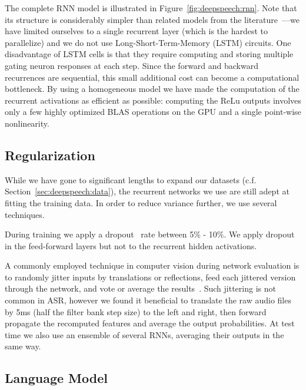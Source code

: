 The complete RNN model is illustrated in Figure~\ref{fig:deepspeech:rnn}. Note
that its structure is considerably simpler than related models from the
literature~\cite{graves2014}---we have limited ourselves to a single recurrent
layer (which is the hardest to parallelize) and we do not use
Long-Short-Term-Memory (LSTM) circuits. One disadvantage of LSTM cells is that
they require computing and storing multiple gating neuron responses at each
step. Since the forward and backward recurrences are sequential, this small
additional cost can become a computational bottleneck. By using a homogeneous
model we have made the computation of the recurrent activations as efficient as
possible: computing the ReLu outputs involves only a few highly optimized BLAS
operations on the GPU and a single point-wise nonlinearity.

\subsection{Regularization}

While we have gone to significant lengths to expand our datasets (c.f.
Section~\ref{sec:deepspeech:data}), the recurrent networks we use are still
adept at fitting the training data. In order to reduce variance further, we use
several techniques.  

During training we apply a dropout~\cite{hinton2012dropout} rate between 5\% -
10\%. We apply dropout in the feed-forward layers but not to the recurrent
hidden activations.

A commonly employed technique in computer vision during network evaluation is
to randomly jitter inputs by translations or reflections, feed each jittered
version through the network, and vote or average the
results~\cite{krizhevsky2012imagenet}. Such jittering is not common in ASR,
however we found it beneficial to translate the raw audio files by 5ms (half
the filter bank step size) to the left and right, then forward propagate the
recomputed features and average the output probabilities. At test time we also
use an ensemble of several RNNs, averaging their outputs in the same way.

\subsection{Language Model}
\label{sec:deepspeech:languagemodel}

